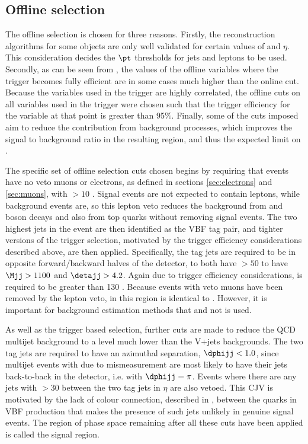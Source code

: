 \subsection{Offline selection}
\label{sec:promptofflinesel}
The offline selection is chosen for three reasons. Firstly, the reconstruction algorithms for some objects are only well validated for certain values of \pt and $\eta$. This consideration decides the $\pt$ thresholds for jets and leptons to be used. Secondly, as can be seen from , the values of the offline variables where the trigger becomes fully efficient are in some cases much higher than the online cut. Because the variables used in the trigger are highly correlated, the offline cuts on all variables used in the trigger were chosen such that the trigger efficiency for the variable at that point is greater than 95\%. Finally, some of the cuts imposed aim to reduce the contribution from background processes, which improves the signal to background ratio in the resulting region, and thus the expected limit on \BRinv.

The specific set of offline selection cuts chosen begins by requiring that events have no veto muons or electrons, as defined in sections \ref{sec:electrons} and \ref{sec:muons}, with \pt$>10$ \GeV. Signal events are not expected to contain leptons, while background events are, so this lepton veto reduces the background from \PW and \PZ boson decays and also from top quarks without removing signal events. The two highest \pt jets in the event are then identified as the VBF tag pair, and tighter versions of the trigger selection, motivated by the trigger efficiency considerations described above, are then applied. Specifically, the tag jets are required to be in opposite forward/backward halves of the detector, to both have \pt$>50$ \GeV to have $\Mjj>1100$ \GeV and $\detajj>4.2$. Again due to trigger efficiency considerations, \METnoMU is required to be greater than 130 \GeV.  Because events with veto muons have been removed by the lepton veto, \METnoMU in this region is identical to \MET. However, it is important for background estimation methods that \METnoMU and not \MET is used.

As well as the trigger based selection, further cuts are made to reduce the \ac{QCD} multijet background to a level much lower than the V+jets backgrounds. The two tag jets are required to have an azimuthal separation, $\dphijj<1.0$, since multijet events with \MET due to mismeasurement are most likely to have their jets back-to-back in the detector, i.e. with $\dphijj=\pi$. Events where there are any jets with \pt$>30$ \GeV between the two tag jets in $\eta$ are also vetoed. This \ac{CJV} is motivated by the lack of colour connection, described in , between the quarks in VBF production that makes the presence of such jets unlikely in genuine signal events. The region of phase space remaining after all these cuts have been applied is called the signal region.

